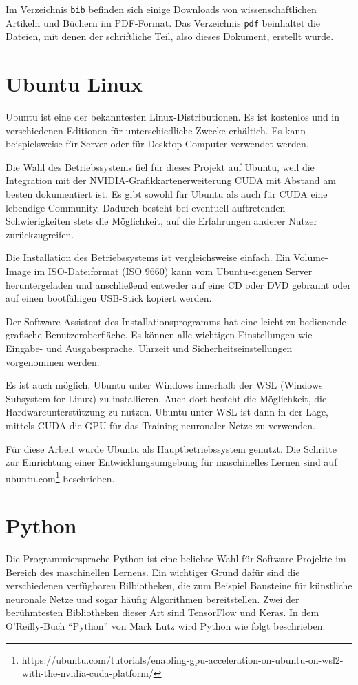 Im Verzeichnis \lstinline|bib| befinden sich einige Downloads von wissenschaftlichen Artikeln und Büchern im PDF-Format. Das Verzeichnis \lstinline|pdf| beinhaltet die Dateien, mit denen der schriftliche Teil, also dieses Dokument, erstellt wurde.

\section{Ubuntu Linux}
\label{sec:ubuntu}
Ubuntu ist eine der bekanntesten Linux-Distributionen. Es ist kostenlos und in verschiedenen Editionen für unterschiedliche Zwecke erhältich. Es kann beispielsweise für Server oder für Desktop-Computer verwendet werden.

Die Wahl des Betriebssystems fiel für dieses Projekt auf Ubuntu, weil die Integration mit der NVIDIA-Grafikkartenerweiterung CUDA mit Abstand am besten dokumentiert ist. Es gibt sowohl für Ubuntu als auch für CUDA eine lebendige Community. Dadurch besteht bei eventuell auftretenden Schwierigkeiten stets die Möglichkeit, auf die Erfahrungen anderer Nutzer zurückzugreifen.

Die Installation des Betriebssystems ist vergleichsweise einfach. Ein Volume-Image im ISO-Dateiformat (ISO 9660) kann vom Ubuntu-eigenen Server heruntergeladen und anschließend entweder auf eine CD oder DVD gebrannt oder auf einen bootfähigen USB-Stick kopiert werden.

Der Software-Assistent des Installationsprogramms hat eine leicht zu bedienende grafische Benutzeroberfläche. Es können alle wichtigen Einstellungen wie Eingabe- und Ausgabesprache, Uhrzeit und Sicherheitseinstellungen vorgenommen werden.

Es ist auch möglich, Ubuntu unter Windows innerhalb der WSL (Windows Subsystem for Linux) zu installieren. Auch dort besteht die Möglichkeit, die Hardwareunterstützung zu nutzen. Ubuntu unter WSL ist dann in der Lage, mittels CUDA die GPU für das Training neuronaler Netze zu verwenden.

Für diese Arbeit wurde Ubuntu als Hauptbetriebssystem genutzt. Die Schritte zur Einrichtung einer Entwicklungsumgebung für maschinelles Lernen sind auf ubuntu.com\footnote{https://ubuntu.com/tutorials/enabling-gpu-acceleration-on-ubuntu-on-wsl2-with-the-nvidia-cuda-platform/} beschrieben.

\section{Python}
\label{sec:python}
Die Programmiersprache Python ist eine beliebte Wahl für Software-Projekte im Bereich des maschinellen Lernens. Ein wichtiger Grund dafür sind die verschiedenen verfügbaren Bilbiotheken, die zum Beispiel Bausteine für künstliche neuronale Netze und sogar häufig Algorithmen bereitstellen. Zwei der berühmtesten Bibliotheken dieser Art sind TensorFlow und Keras. In dem O'Reilly-Buch ``Python'' von Mark Lutz \cite{lutz2013python} wird Python wie folgt beschrieben:

